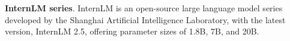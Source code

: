 \noindent \textbf{InternLM series}. InternLM \cite{cai2024internlm2} is an open-source large language model series developed by the Shanghai Artificial Intelligence Laboratory, with the latest version, InternLM 2.5, offering parameter sizes of 1.8B, 7B, and 20B. 















